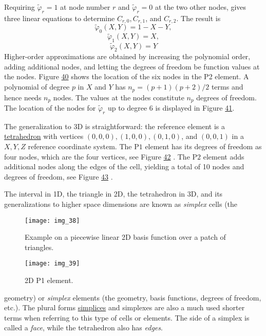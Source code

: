 \documentclass[../main.tex]{subfiles}
\begin{document}
	Requiring $\tilde{\varphi}_{r}=1$ at node number $r$ and $\tilde{\varphi}_{r}=0$ at the two other nodes, gives three linear equations to determine $C_{r, 0}, C_{r, 1}$, and $C_{r, 2}$. The result is
	\begin{equation}\label{eqa109}
		\tilde{\varphi}_{0}(X, Y)=1-X-Y,
	\end{equation}
	\begin{equation}\label{eqa110}
		\tilde{\varphi}_{1}(X, Y)=X,
	\end{equation}
	\begin{equation}\label{eqa111}
		\tilde{\varphi}_{2}(X, Y)=Y
	\end{equation}
	Higher-order approximations are obtained by increasing the polynomial order, adding additional nodes, and letting the degrees of freedom be function values at the nodes. Figure \hyperref[fig:img_40]{40} shows the location of the six nodes in the P2 element.
	A polynomial of degree $p$ in $X$ and $Y$ has $n_{p}=(p+1)(p+2) / 2$ terms and hence needs $n_{p}$ nodes. The values at the nodes constitute $n_{p}$ degrees of freedom. The location of the nodes for $\tilde{\varphi}_{r}$ up to degree 6 is displayed in Figure \hyperref[fig:img_41]{41}.
	
	The generalization to $3 \mathrm{D}$ is straightforward: the reference element is a \href{https://en.wikipedia.org/wiki/Tetrahedron}{tetrahedron} with vertices $(0,0,0),(1,0,0),(0,1,0)$, and $(0,0,1)$ in a $X, Y, Z$ reference coordinate system. The $\mathrm{P} 1$ element has its degrees of freedom as four nodes, which are the four vertices, see Figure \hyperref[fig:img_42]{42} . The $\mathrm{P} 2$ element adds additional nodes along the edges of the cell, yielding a total of 10 nodes and degrees of freedom, see Figure \hyperref[fig:img_43]{43} .
	
	The interval in 1D, the triangle in 2D, the tetrahedron in 3D, and its generalizations to higher space dimensions are known as \textit{simplex} cells (the
	\begin{figure}[H]
		\centering
		\texttt{[image: img\_38]}
		\caption{Example on a piecewise linear 2D basis function over a patch of
			triangles.}
		\label{fig:img_38}
	\end{figure}
	\begin{figure}[H]
		\centering
		\texttt{[image: img\_39]}
		\caption{2D P1 element.}
		\label{fig:img_39}
	\end{figure}
	
	\noindent geometry) or \textit{simplex} elements (the geometry, basis functions, degrees of freedom,
	etc.). The plural forms \href{https://en.wikipedia.org/wiki/Simplex}{simplices} and simplexes are also a much used shorter
	terms when referring to this type of cells or elements. The side of a simplex is
	called a \textit{face}, while the tetrahedron also has \textit{edges}.
	
\end{document}
